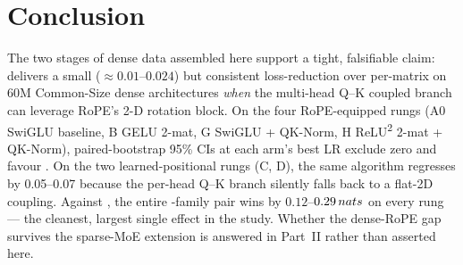 \section{Conclusion}\label{sec:concl}

The two stages of dense data assembled here support a tight, falsifiable claim: \optCoupled{} delivers a small ($\approx 0.01$--$0.024$\nats) but consistent loss-reduction over per-matrix \optMuon{} on 60M Common-Size dense architectures \emph{when} the multi-head Q--K coupled branch can leverage RoPE's 2-D rotation block. On the four RoPE-equipped rungs (A0 SwiGLU baseline, B GELU 2-mat, G SwiGLU + QK-Norm, H ReLU\textsuperscript{2} 2-mat + QK-Norm), paired-bootstrap 95\% CIs at each arm's best LR exclude zero and favour \optCoupled. On the two learned-positional rungs (C, D), the same algorithm regresses by 0.05--0.07\nats{} because the per-head Q--K branch silently falls back to a flat-2D coupling. Against \optAdamW, the entire \optMuon{}-family pair wins by $0.12$--$0.29\,nats{}$ on every rung --- the cleanest, largest single effect in the study. Whether the dense-RoPE gap survives the sparse-MoE extension is answered in Part~II rather than asserted here.
